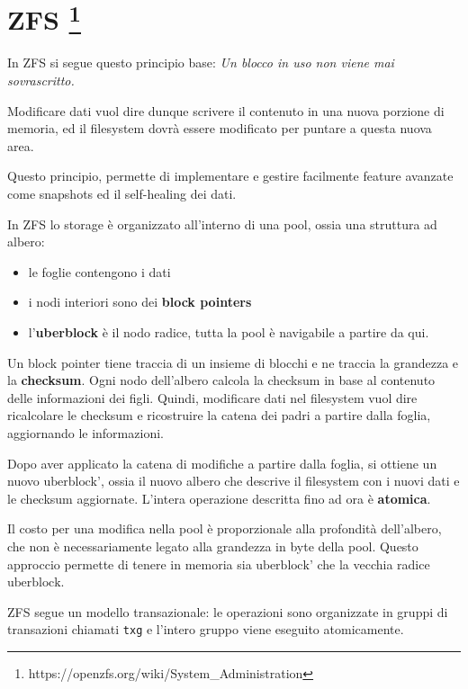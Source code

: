 \section[ZFS ]{\texorpdfstring{ZFS \footnote{\label{fn:ref_29}https://openzfs.org/wiki/System\_Administration}}{ZFS }}\label{zfs-1}

In ZFS si segue questo principio base: \emph{Un blocco in uso non viene
mai sovrascritto.}

Modificare dati vuol dire dunque scrivere il contenuto in una nuova
porzione di memoria, ed il filesystem dovrà essere modificato per
puntare a questa nuova area.

Questo principio, permette di implementare e gestire facilmente feature
avanzate come snapshots ed il self-healing dei dati.

In ZFS lo storage è organizzato all'interno di una pool, ossia una
struttura ad albero:

\begin{itemize}
\tightlist
\item
  le foglie contengono i dati
\item
  i nodi interiori sono dei \textbf{block pointers}
\item
  l'\textbf{uberblock} è il nodo radice, tutta la pool è navigabile a
  partire da qui.
\end{itemize}

Un block pointer tiene traccia di un insieme di blocchi e ne traccia la
grandezza e la \textbf{checksum}. Ogni nodo dell'albero calcola la
checksum in base al contenuto delle informazioni dei figli. Quindi,
modificare dati nel filesystem vuol dire ricalcolare le checksum e
ricostruire la catena dei padri a partire dalla foglia, aggiornando le
informazioni.

Dopo aver applicato la catena di modifiche a partire dalla foglia, si
ottiene un nuovo \(\text{uberblock'}\), ossia il nuovo albero che
descrive il filesystem con i nuovi dati e le checksum aggiornate.
L'intera operazione descritta fino ad ora è \textbf{atomica}.

Il costo per una modifica nella pool è proporzionale alla profondità
dell'albero, che non è necessariamente legato alla grandezza in byte
della pool. Questo approccio permette di tenere in memoria sia
\(\text{uberblock'}\) che la vecchia radice \(\text{uberblock}\).

ZFS segue un modello transazionale: le operazioni sono organizzate in
gruppi di transazioni chiamati \passthrough{\lstinline!txg!} e l'intero
gruppo viene eseguito atomicamente.

